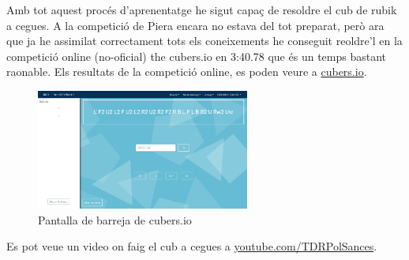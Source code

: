 Amb tot aquest procés d'aprenentatge he sigut capaç de resoldre el cub de rubik a cegues. A la competició de Piera encara no estava del tot preparat, però ara que ja he assimilat correctament tots els coneixements he conseguit reoldre'l en la competició online (no-oficial) the cubers.io en 3:40.78 que és un temps bastant raonable. Els resultats de la competició online, es poden veure a  \href{https://www.cubers.io/u/CUBEANDO_CON_POL/}{cubers.io}.

\begin{figure}[!h]
    \centering
    \includegraphics[width=7cm]{img/figures/captura-cubersio.png}
    \caption{Pantalla de barreja de cubers.io}
\end{figure}

Es pot veue un video on faig el cub a cegues a \href{https://www.youtube.com/channel/UCKCx79bCK7JOS4YsgLHbEgA}{youtube.com/TDRPolSances}.
